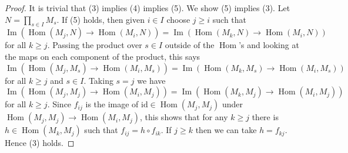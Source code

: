 \documentclass[10pt,a4paper]{amsart}
\theoremstyle{plain}
\theoremstyle{definition}
\theoremstyle{remark}
\numberwithin{equation}{subsection}
\def\Hom{\mathop{\mathrm{Hom}}\nolimits}
\def\Im{\mathop{\mathrm{Im}}}
\begin{document}
\begin{proof}
\medskip\noindent
It is trivial that (3) implies (4) implies (5).  We show (5) implies (3).  Let
$N = \prod_{s \in I} M_s$. If (5) holds, then given $i \in I$ choose $j \geq i$
such that
$$
\Im( \Hom(M_j, N) \to  \Hom(M_i, N)) =
\Im( \Hom(M_k, N) \to  \Hom(M_i, N))
$$
for all $k \geq j$.  Passing the product over $s \in I$ outside of the
$\Hom$'s
and looking at the maps on each component of the product, this says
$$
\Im( \Hom(M_j, M_s) \to  \Hom(M_i, M_s)) =
\Im( \Hom(M_k, M_s) \to   \Hom(M_i, M_s))
$$
for all $k \geq j$ and $s \in I$.  Taking $s = j$ we have
$$
\Im( \Hom(M_j, M_j) \to  \Hom(M_i, M_j)) =
\Im( \Hom(M_k, M_j) \to   \Hom(M_i, M_j))
$$
for all $k \geq j$.  Since $f_{ij}$ is the image of
$\text{id} \in  \Hom(M_j, M_j)$ under
$\Hom(M_j, M_j) \to  \Hom(M_i, M_j)$,
this shows  that for any $k \geq j$ there is $h \in \Hom(M_k, M_j)$
such that $f_{ij} = h \circ f_{ik}$.  If $j \geq k$ then we can take
$h = f_{kj}$. Hence (3) holds.
\end{proof}
\end{document}
